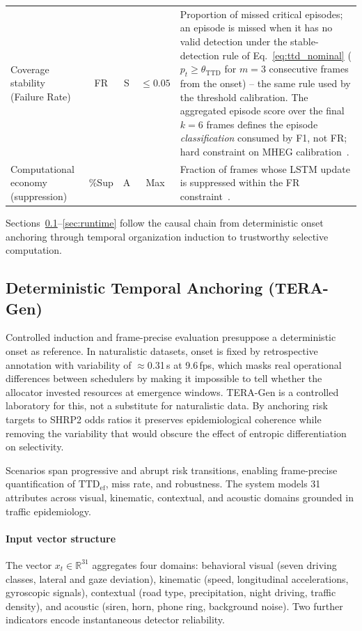 \documentclass[a4paper,fleqn]{cas-dc}
\newcommand{\TERAGen}{\mbox{TERA-Gen}\xspace}
\begin{document}
\begin{table}[!tbp]
\begin{tabularx}{\textwidth}{>{\raggedright\arraybackslash}p{2.9cm}
  c c c
  >{\raggedright\arraybackslash}X}
\rowcolor{gray!8}
Coverage stability (Failure Rate)
  & FR & S & $\le 0.05$
  & Proportion of missed critical episodes{\color{\revcolor}; an episode is
    missed when it has no valid detection under the stable-detection rule of
    Eq.~\ref{eq:ttd_nominal} ($p_t \ge \theta_{\mathrm{TTD}}$ for $m{=}3$
    consecutive frames from the onset) -- the same rule used by the threshold
    calibration. The aggregated episode score over the final $k{=}6$ frames
    defines the episode \emph{classification} consumed by F1, not FR}; hard
    constraint on MHEG calibration~\cite{iso26262}. \\
Computational economy (suppression)
  & \%Sup & A & Max
  & Fraction of frames whose LSTM update is suppressed within the FR
    constraint~\cite{campos2018skip}. \\
\bottomrule
\end{tabularx}
\end{table}

Sections~\ref{sec:tera_gen}--\ref{sec:runtime} follow the causal chain from deterministic onset anchoring through temporal organization induction to trustworthy selective computation.
\subsection{Deterministic Temporal Anchoring (\mbox{TERA-Gen})}
\label{sec:tera_gen}
Controlled induction and frame-precise evaluation presuppose a deterministic
onset as reference. In naturalistic datasets, onset is fixed by retrospective
annotation with variability of $\approx$0.31\,s at 9.6\,fps, which masks real
operational differences between schedulers by making it impossible to tell
whether the allocator invested resources at emergence windows. \TERAGen is a
controlled laboratory for this, not a substitute for naturalistic data. By
anchoring risk targets to SHRP2 odds ratios it preserves epidemiological
coherence while removing the variability that would obscure the effect of
entropic differentiation on selectivity.

Scenarios span progressive and abrupt risk transitions, enabling frame-precise
quantification of $\mathrm{TTD}_{\mathrm{ef}}$, miss rate, and robustness. The
system models 31 attributes across visual, kinematic, contextual, and acoustic
domains grounded in traffic epidemiology.
\paragraph{Input vector structure}
The vector $x_t \in \mathbb{R}^{31}$ aggregates four domains: behavioral visual
(seven driving classes, lateral and gaze deviation), kinematic (speed,
longitudinal accelerations, gyroscopic signals), contextual (road type,
precipitation, night driving, traffic density), and acoustic (siren, horn,
phone ring, background noise). Two further indicators encode instantaneous
detector reliability.
\end{document}
